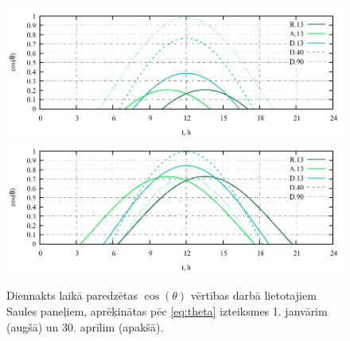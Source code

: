 \begin{figure}[h]
	\centering
	\includegraphics[width=\linewidth]{figures/misc/cos-theta-jan.pdf}
	\includegraphics[width=\linewidth]{figures/misc/cos-theta-apr.pdf}
	\caption{Diennakts laikā paredzētas $\cos(\theta)$ vērtības darbā lietotajiem Saules paneļiem, aprēķinātas pēc \ref{eq:theta} izteiksmes 1. janvārim (augšā) un 30. aprīlim (apakšā).}
	\label{fig:cos-theta}
\end{figure}